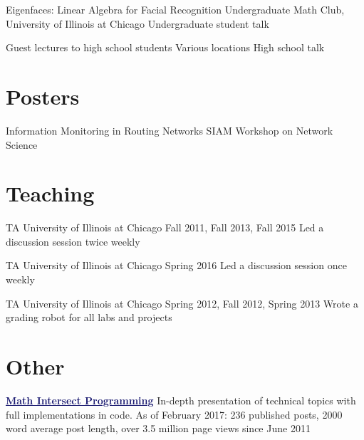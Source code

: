 \documentclass[11pt]{moderncv}
\begin{document}
         {Eigenfaces: Linear Algebra for Facial Recognition}
      {Undergraduate Math Club, University of Illinois at Chicago}
      {Undergraduate student talk}
      {}
{}

         {Guest lectures to high school students}
      {Various locations}
      {High school talk}
      {}
{}


   \section{Posters}
         {Information Monitoring in Routing Networks}
      {}
      {SIAM Workshop on Network Science}
      {}
      {}


   \section{Teaching}
         {TA}
      {University of Illinois at Chicago}
      {Fall 2011, Fall 2013, Fall 2015}
      {}
      {Led a discussion session twice weekly}

         {TA}
      {University of Illinois at Chicago}
      {Spring 2016}
      {}
      {Led a discussion session once weekly}

         {TA}
      {University of Illinois at Chicago}
      {Spring 2012, Fall 2012, Spring 2013}
      {}
      {Wrote a grading robot for all labs and projects}


   \section{Other}
         {\href{http://jeremykun.com}{\textcolor{MidnightBlue}{\underline{\textbf{Math Intersect Programming}}}}}
      {}
      {In-depth presentation of technical topics with full implementations in code. As of February 2017: 236 published posts, 2000 word average post length, over 3.5 million page views since June 2011}
      {}
      {}
\end{document}
